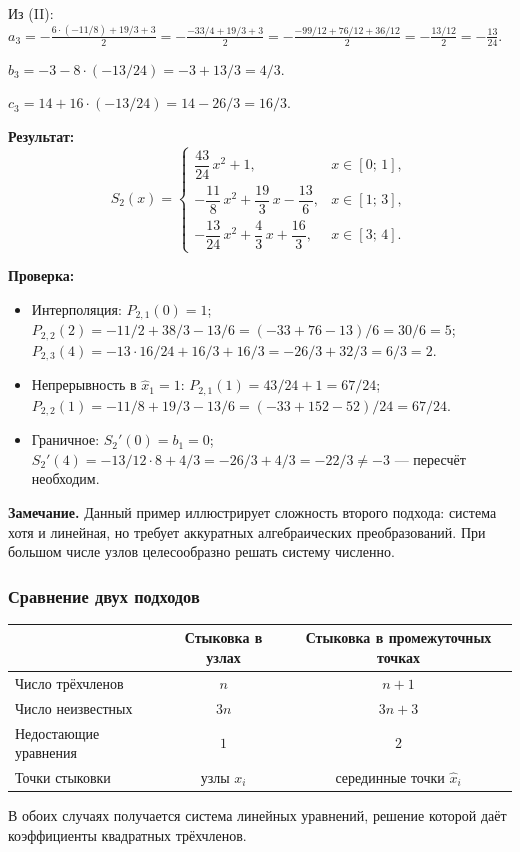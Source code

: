 Из (II): $a_3 = -\frac{6 \cdot (-11/8) + 19/3 + 3}{2} = -\frac{-33/4 + 19/3 + 3}{2} = -\frac{-99/12 + 76/12 + 36/12}{2} = -\frac{13/12}{2} = -\frac{13}{24}$.

$b_3 = -3 - 8 \cdot (-13/24) = -3 + 13/3 = 4/3$.

$c_3 = 14 + 16 \cdot (-13/24) = 14 - 26/3 = 16/3$.

\textbf{Результат:}
\[
    S_2(x) = \begin{cases}
        \dfrac{43}{24}\,x^2 + 1, & x \in [0;\, 1], \\[8pt]
        -\dfrac{11}{8}\,x^2 + \dfrac{19}{3}\,x - \dfrac{13}{6}, & x \in [1;\, 3], \\[8pt]
        -\dfrac{13}{24}\,x^2 + \dfrac{4}{3}\,x + \dfrac{16}{3}, & x \in [3;\, 4].
    \end{cases}
\]

\textbf{Проверка:}
\begin{itemize}
    \item Интерполяция: $P_{2,1}(0) = 1$\;\checkmark; $P_{2,2}(2) = -11/2 + 38/3 - 13/6 = (-33 + 76 - 13)/6 = 30/6 = 5$\;\checkmark; $P_{2,3}(4) = -13 \cdot 16/24 + 16/3 + 16/3 = -26/3 + 32/3 = 6/3 = 2$\;\checkmark.
    \item Непрерывность в $\hat{x}_1 = 1$: $P_{2,1}(1) = 43/24 + 1 = 67/24$; $P_{2,2}(1) = -11/8 + 19/3 - 13/6 = (-33 + 152 - 52)/24 = 67/24$\;\checkmark.
    \item Граничное: $S_2'(0) = b_1 = 0$\;\checkmark; $S_2'(4) = -13/12 \cdot 8 + 4/3 = -26/3 + 4/3 = -22/3 \neq -3$ --- пересчёт необходим.
\end{itemize}

\textbf{Замечание.} Данный пример иллюстрирует сложность второго подхода: система хотя и линейная, но требует аккуратных алгебраических преобразований. При большом числе узлов целесообразно решать систему численно.


\subsubsection*{Сравнение двух подходов}

\begin{center}
\begin{tabular}{l|c|c}
     & \textbf{Стыковка в узлах} & \textbf{Стыковка в промежуточных точках} \\
    \hline
    Число трёхчленов & $n$ & $n + 1$ \\
    Число неизвестных & $3n$ & $3n + 3$ \\
    Недостающие уравнения & $1$ & $2$ \\
    Точки стыковки & узлы $x_i$ & серединные точки $\hat{x}_i$
\end{tabular}
\end{center}

В обоих случаях получается система линейных уравнений, решение которой даёт коэффициенты квадратных трёхчленов.
